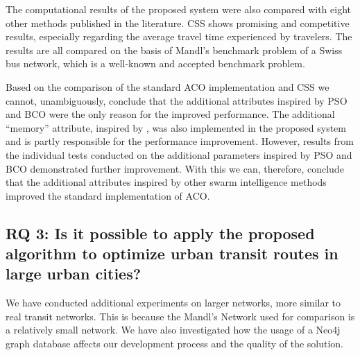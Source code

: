 The computational results of the proposed system were also compared with eight other methods published in the literature. CSS shows promising and competitive results, especially regarding the average travel time experienced by travelers. The results are all compared on the basis of Mandl's benchmark problem of a Swiss bus network, which is a well-known and accepted benchmark problem. 

Based on the comparison of the standard ACO implementation and CSS we cannot, unambiguously, conclude that the additional attributes inspired by PSO and BCO were the only reason for the improved performance. The additional ``memory'' attribute, inspired by \citet{dorigo96, sedighpour14, poorzahedy11, salehinejad10}, was also implemented in the proposed system and is partly responsible for the performance improvement. However, results from the individual tests conducted on the additional parameters inspired by PSO and BCO demonstrated further improvement. With this we can, therefore, conclude that the additional attributes inspired by other swarm intelligence methods improved the standard implementation of ACO. 





\subsection*{RQ 3: Is it possible to apply the proposed algorithm to optimize urban transit routes in large urban cities?}

We have conducted additional experiments on larger networks, more similar to real transit networks. This is because the Mandl's Network used for comparison is a relatively small network. We have also investigated how the usage of a Neo4j graph database affects our development process and the quality of the solution. 


